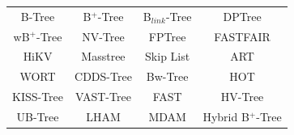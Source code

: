 \documentclass[usenames,dvipsnames, 18pt, compress, aspectratio=169]{beamer}
\begin{document}
\begin{frame}[fragile]{}
    \frametitle{}

    \def\arraystretch{1.5}
    \begin{tabular}{cccc}
        B-Tree & B$^{+}$-Tree & B$_{link}$-Tree & DPTree \\
        wB$^{+}$-Tree & NV-Tree & FPTree & FASTFAIR \\
        HiKV & Masstree & Skip List & ART \\
        WORT & CDDS-Tree & Bw-Tree & HOT \\
        KISS-Tree & VAST-Tree & FAST & HV-Tree \\
        UB-Tree & LHAM & MDAM & Hybrid B$^{+}$-Tree
    \end{tabular}
\end{frame}
\end{document}
